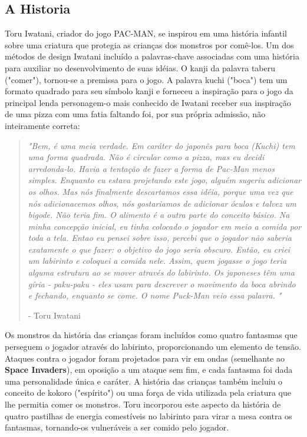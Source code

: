 \subsection{A Historia}\label{history}


Toru Iwatani, criador do jogo PAC-MAN, se inspirou em uma história infantil sobre uma criatura que protegia as crianças dos monstros por comê-los. Um dos métodos de design Iwatani incluído a palavras-chave associadas com uma história para auxiliar no desenvolvimento de suas idéias. O kanji da palavra taberu ("comer"), tornou-se a premissa para o jogo. A palavra kuchi ("boca") tem um formato quadrado para seu símbolo kanji e forneceu a inspiração para o jogo da principal lenda personagem-o mais conhecido de Iwatani receber sua inspiração de uma pizza com uma fatia faltando foi, por sua própria admissão, não inteiramente correta: 

\begin{quote}
	\textit{"Bem, é uma meia verdade. Em caráter do japonês para boca (Kuchi) tem uma forma quadrada. Não é circular como a pizza, mas eu decidi arredonda-lo. Havia a tentação de fazer a forma de Pac-Man menos simples. Enquanto eu estava projetando este jogo, alguém sugeriu adicionar os olhos. Mas nós finalmente descartamos essa idéia, porque uma vez que nós adicionacemos olhos, nós gostariamos de adicionar óculos e talvez um bigode. Não teria fim. O alimento é a outra parte do conceito básico. Na minha concepção inicial, eu tinha colocado o jogador em meio a comida por toda a tela. Entao eu pensei sobre isso, percebi que o jogador não saberia exatamente o que fazer: o objetivo do jogo seria obscuro. Então, eu criei um labirinto e coloquei a comida nele. Assim, quem jogasse o jogo teria alguma estrutura ao se mover através do labirinto. Os japoneses têm uma gíria - paku-paku - eles usam para descrever o movimento da boca abrindo e fechando, enquanto se come. O nome Puck-Man veio essa palavra. "}

- Toru Iwatani
\end{quote}

Os monstros da história das crianças foram incluídos como quatro fantasmas que perseguem o jogador através do labirinto, proporcionando um elemento de tensão. Ataques contra o jogador foram projetados para vir em ondas (semelhante ao \textbf{Space Invaders}), em oposição a um ataque sem fim, e cada fantasma foi dada uma personalidade única e caráter. A história das crianças também incluiu o conceito de kokoro ("espírito") ou uma força de vida utilizada pela criatura que lhe permitia comer os monstros. Toru incorporou este aspecto da história de quatro pastilhas de energia comestíveis no labirinto para virar a mesa contra os fantasmas, tornando-os vulneráveis ​​a ser comido pelo jogador.

